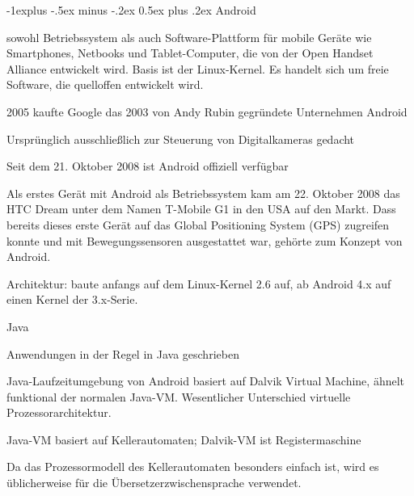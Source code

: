 \documentclass[a4paper]{article}
\makeatletter
\renewcommand{\subsection}{\@startsection{subsection}{2}{0mm}%
                                {-1explus -.5ex minus -.2ex}%
                                {0.5ex plus .2ex}%
                                {\normalfont\normalsize\bfseries}}
\makeatother
\begin{document}
\begin{multicols*}{2}
  \subsection{Android}
  \begin{itemize*}
    \item sowohl Betriebssystem als auch Software-Plattform für mobile Geräte wie Smartphones, Netbooks und Tablet-Computer, die von der Open Handset Alliance entwickelt wird. Basis ist der Linux-Kernel. Es handelt sich um freie Software, die quelloffen entwickelt wird.
    \item 2005 kaufte Google das 2003 von Andy Rubin gegründete Unternehmen Android
    \item Ursprünglich ausschließlich zur Steuerung von Digitalkameras gedacht
    \item Seit dem 21. Oktober 2008 ist Android offiziell verfügbar
    \item Als erstes Gerät mit Android als Betriebssystem kam am 22. Oktober 2008 das HTC Dream unter dem Namen T-Mobile G1 in den USA auf den Markt. Dass bereits dieses erste Gerät auf das Global Positioning System (GPS) zugreifen konnte und mit Bewegungssensoren ausgestattet war, gehörte zum Konzept von Android.
    \item Architektur: baute anfangs auf dem Linux-Kernel 2.6 auf, ab Android 4.x auf einen Kernel der 3.x-Serie.
    \item Java
    \begin{itemize*}
      \item Anwendungen in der Regel in Java geschrieben
      \item Java-Laufzeitumgebung von Android basiert auf Dalvik Virtual Machine, ähnelt funktional der normalen Java-VM. Wesentlicher Unterschied virtuelle Prozessorarchitektur.
      \item Java-VM basiert auf Kellerautomaten; Dalvik-VM ist Registermaschine
      \item Da das Prozessormodell des Kellerautomaten besonders einfach ist, wird es üblicherweise für die Übersetzerzwischensprache verwendet.
    \end{itemize*}
  \end{itemize*}


\end{multicols*}
\end{document}
